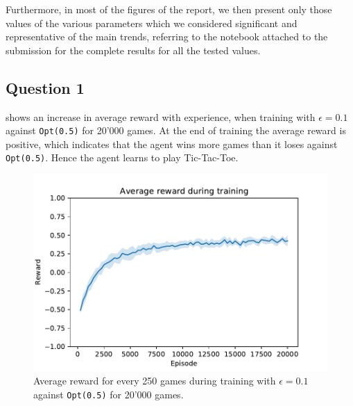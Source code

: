 \documentclass[10pt]{IEEEtran}
\begin{document}
Furthermore, in most of the figures of the report, we then present only those values of the various parameters which we considered significant and representative of the main trends, referring to the notebook attached to the submission for the complete results for all the tested values.

\subsection*{Question 1}
 shows an increase in average reward with experience, when training with $\epsilon = 0.1$ against \texttt{Opt(0.5)} for 20'000 games. At the end of training the average reward is positive, which indicates that the agent wins more games than it loses against \texttt{Opt(0.5)}. Hence the agent learns to play Tic-Tac-Toe.
\begin{figure}[h]
    \centering
    \includegraphics[width = 0.85\linewidth]{code/figures/rewards_Q1.pdf}
    \caption{Average reward for every 250 games during training with $\epsilon = 0.1$ against \texttt{Opt(0.5)} for 20'000 games.}
    \label{plot_question1}
\end{figure}
\end{document}
